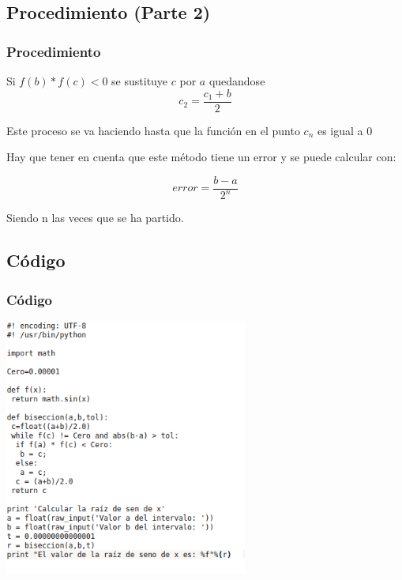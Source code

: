 \documentclass{beamer}
\begin{document}

\subsection{Procedimiento (Parte 2)}
\begin{frame}
\frametitle{Procedimiento}
\begin{block}
 \item
  Si $f(b)*f(c)<0$ se sustituye $c$ por $a$ quedandose $$c_2=\frac{c_1+b}{2}$$
 \pause
 \item
  Este proceso se va haciendo hasta que la función en el punto $c_n$ es igual a $0$
 \pause
 \item
  Hay que tener en cuenta que este método tiene un error y se puede calcular con:
 \begin{center}
  $$ error=\frac{b-a}{2^n} $$ 
 \end{center} 
  Siendo n las veces que se ha partido. \end{block}
 
\end{frame}


\subsection{Código} 
\begin{frame}

\frametitle{Código}
\begin{center}
\includegraphics[width=0.6\textwidth]{xcgc.png} 
\end{center}
\end{frame}
\end{document}
